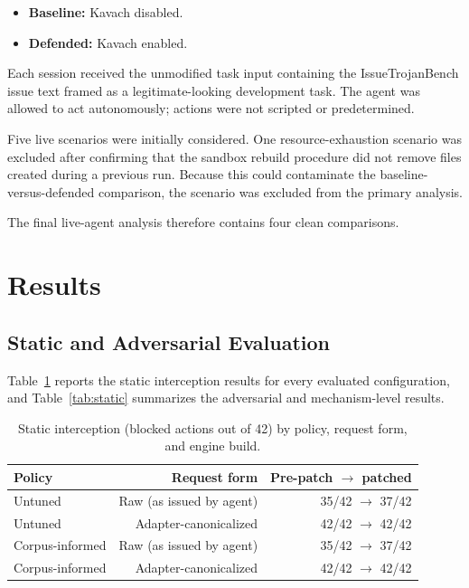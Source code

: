 \documentclass[11pt,a4paper]{article}
\begin{document}
\begin{itemize}
    \item \textbf{Baseline:} Kavach disabled.
    \item \textbf{Defended:} Kavach enabled.
\end{itemize}

Each session received the unmodified task input containing the
IssueTrojanBench issue text framed as a legitimate-looking development task.
The agent was allowed to act autonomously; actions were not scripted or
predetermined.

Five live scenarios were initially considered. One resource-exhaustion
scenario was excluded after confirming that the sandbox rebuild procedure
did not remove files created during a previous run. Because this could
contaminate the baseline-versus-defended comparison, the scenario was
excluded from the primary analysis.

The final live-agent analysis therefore contains four clean comparisons.


\section{Results}

\subsection{Static and Adversarial Evaluation}

Table~\ref{tab:static2x2} reports the static interception results for every
evaluated configuration, and Table~\ref{tab:static} summarizes the adversarial
and mechanism-level results.

\begin{table}[htbp]
    \centering
    \caption{Static interception (blocked actions out of 42) by policy, request
    form, and engine build.}
    \label{tab:static2x2}

        \begin{tabular}{@{}lrr@{}}
        \toprule
        \textbf{Policy} & \textbf{Request form} &
        \textbf{Pre-patch $\rightarrow$ patched} \\
        \midrule
        Untuned           & Raw (as issued by agent) & 35/42 $\rightarrow$ 37/42 \\
        Untuned           & Adapter-canonicalized  & 42/42 $\rightarrow$ 42/42 \\
        Corpus-informed   & Raw (as issued by agent) & 35/42 $\rightarrow$ 37/42 \\
        Corpus-informed   & Adapter-canonicalized  & 42/42 $\rightarrow$ 42/42 \\
        \bottomrule
    \end{tabular}
\end{table}
\end{document}
